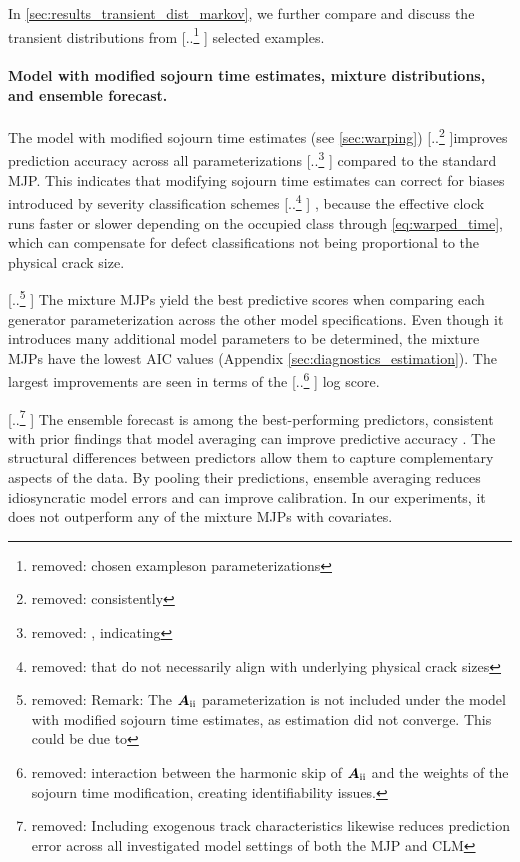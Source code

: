 \documentclass{article}
\newcommand{\RN}[1]{\textup{\uppercase\expandafter{\romannumeral#1}}}
\providecommand{\DIFadd}[1]{{\protect\color{blue} \sf #1}} %
\providecommand{\DIFdel}[1]{{\protect\color{red} [..\footnote{removed: #1} ]}} %
\providecommand{\DIFaddbegin}{} %
\providecommand{\DIFaddend}{} %
\providecommand{\DIFdelbegin}{} %
\providecommand{\DIFdelend}{} %
\begin{document}
\DIFadd{In \cref{sec:results_transient_dist_markov}}\DIFaddend , we further compare and discuss the transient distributions from \DIFdelbegin \DIFdel{chosen exampleson parameterizations}\DIFdelend \DIFaddbegin \DIFadd{selected examples}\DIFaddend .



\DIFaddbegin \paragraph{\DIFadd{Model with modified sojourn time estimates, mixture distributions, and ensemble forecast.}}
\DIFaddend The model with modified sojourn time estimates (see \cref{sec:warping}) \DIFdelbegin \DIFdel{consistently }\DIFdelend improves prediction accuracy across all parameterizations \DIFdelbegin \DIFdel{, indicating }\DIFdelend \DIFaddbegin \DIFadd{compared to the standard MJP. This indicates }\DIFaddend that modifying sojourn time estimates can correct for biases introduced by severity classification schemes\DIFdelbegin \DIFdel{that do not necessarily align with underlying physical crack sizes}\DIFdelend \DIFaddbegin \DIFadd{, because the effective clock runs faster or slower depending on the occupied class through \cref{eq:warped_time}, which can compensate for defect classifications not being proportional to the physical crack size}\DIFaddend .

\DIFdelbegin \DIFdel{Remark: The $\bm{A}_{\RN{2}}$ parameterization is not included under the model with modified sojourn time estimates, as estimation did not converge. This could be due to }\DIFdelend \DIFaddbegin \DIFadd{The mixture MJPs yield the best predictive scores when comparing each generator parameterization across the other model specifications. Even though it introduces many additional model parameters to be determined, the mixture MJPs have the lowest AIC values (Appendix \ref{sec:diagnostics_estimation}). The largest improvements are seen in terms of }\DIFaddend the \DIFdelbegin \DIFdel{interaction between the harmonic skip of $\bm{A}_{\RN{2}}$ and the weights of the sojourn time modification, creating identifiability issues. }\DIFdelend \DIFaddbegin \DIFadd{log score.
}\DIFaddend 

\DIFdelbegin \DIFdel{Including exogenous track characteristics likewise reduces prediction error across all investigated model settings of both the MJP and CLM }\DIFdelend \DIFaddbegin \DIFadd{The ensemble forecast is among the best-performing predictors, consistent with prior findings that model averaging can improve predictive accuracy \citep{wu2021a}. The structural differences between predictors allow them to capture complementary aspects of the data. By pooling their predictions, ensemble averaging reduces idiosyncratic model errors and can improve calibration. In our experiments, it does not outperform any of the mixture MJPs with covariates.
}
\end{document}
